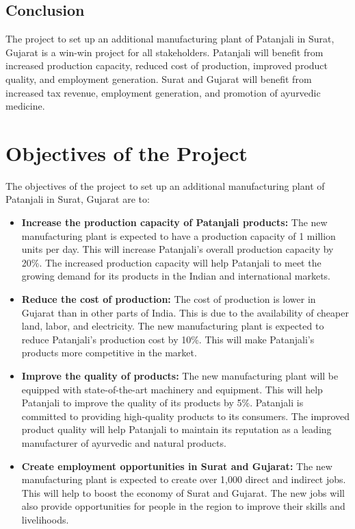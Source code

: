 \subsection{Conclusion}
The project to set up an additional manufacturing plant of Patanjali in Surat, Gujarat is a win-win project for all stakeholders. Patanjali will benefit from increased production capacity, reduced cost of production, improved product quality, and employment generation. Surat and Gujarat will benefit from increased tax revenue, employment generation, and promotion of ayurvedic medicine.

\section{Objectives of the Project}
The objectives of the project to set up an additional manufacturing plant of Patanjali in Surat, Gujarat are to:

\begin{itemize}
    \item \textbf{Increase the production capacity of Patanjali products:} The new manufacturing plant is expected to have a production capacity of 1 million units per day. This will increase Patanjali's overall production capacity by 20\%. The increased production capacity will help Patanjali to meet the growing demand for its products in the Indian and international markets.

    \item \textbf{Reduce the cost of production:} The cost of production is lower in Gujarat than in other parts of India. This is due to the availability of cheaper land, labor, and electricity. The new manufacturing plant is expected to reduce Patanjali's production cost by 10\%. This will make Patanjali's products more competitive in the market.

    \item \textbf{Improve the quality of products:} The new manufacturing plant will be equipped with state-of-the-art machinery and equipment. This will help Patanjali to improve the quality of its products by 5\%. Patanjali is committed to providing high-quality products to its consumers. The improved product quality will help Patanjali to maintain its reputation as a leading manufacturer of ayurvedic and natural products.

    \item \textbf{Create employment opportunities in Surat and Gujarat:} The new manufacturing plant is expected to create over 1,000 direct and indirect jobs. This will help to boost the economy of Surat and Gujarat. The new jobs will also provide opportunities for people in the region to improve their skills and livelihoods.
\end{itemize}

